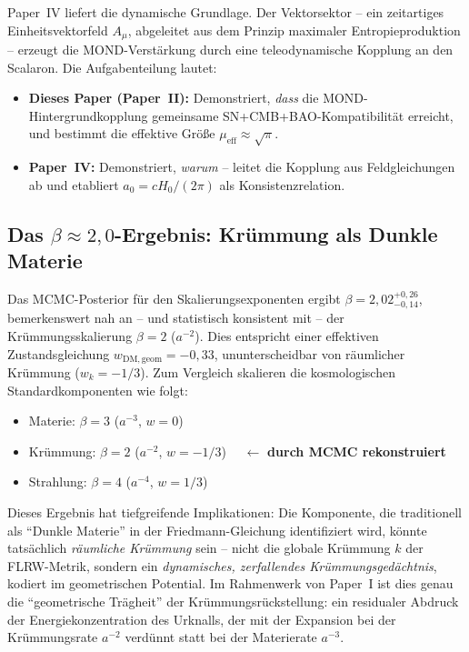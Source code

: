 \documentclass[aps,prd,twocolumn,superscriptaddress,nofootinbib]{revtex4-2}
\begin{document}
Paper~IV \cite{Geiger2026d} liefert die dynamische Grundlage. Der Vektorsektor -- ein zeitartiges Einheitsvektorfeld $A_\mu$, abgeleitet aus dem Prinzip maximaler Entropieproduktion -- erzeugt die MOND-Verst\"arkung durch eine teleodynamische Kopplung an den Scalaron. Die Aufgabenteilung lautet:
\begin{itemize}
\item \textbf{Dieses Paper (Paper~II):} Demonstriert, \emph{dass} die MOND-Hintergrundkopplung gemeinsame SN+CMB+BAO-Kompatibilit\"at erreicht, und bestimmt die effektive Gr\"o\ss{}e $\mu_{\mathrm{eff}} \approx \sqrt{\pi}$.
\item \textbf{Paper~IV:} Demonstriert, \emph{warum} -- leitet die Kopplung aus Feldgleichungen ab und etabliert $a_0 = cH_0/(2\pi)$ als Konsistenzrelation.
\end{itemize}

\subsection{Das $\beta \approx 2{,}0$-Ergebnis: Kr\"ummung als Dunkle Materie}

Das MCMC-Posterior f\"ur den Skalierungsexponenten ergibt $\beta = 2{,}02^{+0{,}26}_{-0{,}14}$, bemerkenswert nah an -- und statistisch konsistent mit -- der Kr\"ummungsskalierung $\beta = 2$ ($a^{-2}$). Dies entspricht einer effektiven Zustandsgleichung $w_{\mathrm{DM,geom}} = -0{,}33$, ununterscheidbar von r\"aumlicher Kr\"ummung ($w_k = -1/3$). Zum Vergleich skalieren die kosmologischen Standardkomponenten wie folgt:
\begin{itemize}
\item Materie: $\beta = 3$ ($a^{-3}$, $w = 0$)
\item Kr\"ummung: $\beta = 2$ ($a^{-2}$, $w = -1/3$) $\quad\leftarrow$ \textbf{durch MCMC rekonstruiert}
\item Strahlung: $\beta = 4$ ($a^{-4}$, $w = 1/3$)
\end{itemize}

Dieses Ergebnis hat tiefgreifende Implikationen: Die Komponente, die traditionell als "`Dunkle Materie"' in der Friedmann-Gleichung identifiziert wird, k\"onnte tats\"achlich \textit{r\"aumliche Kr\"ummung} sein -- nicht die globale Kr\"ummung $k$ der FLRW-Metrik, sondern ein \textit{dynamisches, zerfallendes Kr\"ummungsged\"achtnis}, kodiert im geometrischen Potential. Im Rahmenwerk von Paper~I ist dies genau die "`geometrische Tr\"agheit"' der Kr\"ummungsr\"uckstellung: ein residualer Abdruck der Energiekonzentration des Urknalls, der mit der Expansion bei der Kr\"ummungsrate $a^{-2}$ verd\"unnt statt bei der Materierate $a^{-3}$.
\end{document}
